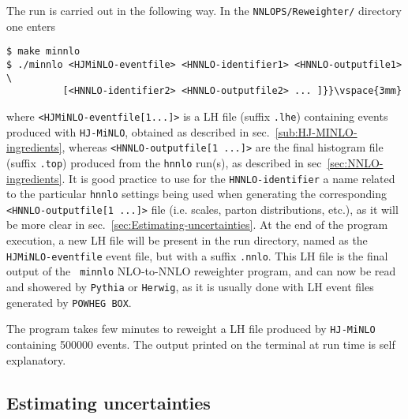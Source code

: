 \documentclass[11pt,a4paper]{article}
\newcommand{\noun}[1]{{\tt #1}}
\newcommand{\POWHEGBOX}{\noun{POWHEG BOX}}
\newcommand{\HJMINLO}{\noun{HJ-MiNLO}}
\newcommand{\HNNLO}{\noun{hnnlo}}
\newcommand{\PYTHIA}{\noun{Pythia}}
\newcommand{\HERWIG}{\noun{Herwig}}
\begin{document}
The run is carried out in the following way. In the {\tt{NNLOPS/Reweighter/}}
directory one enters
\begin{verbatim}
$ make minnlo
$ ./minnlo <HJMiNLO-eventfile> <HNNLO-identifier1> <HNNLO-outputfile1> \
          [<HNNLO-identifier2> <HNNLO-outputfile2> ... ]}}\vspace{3mm}
\end{verbatim}
where {\tt <HJMiNLO-eventfile[1...]>} is a LH file (suffix {\tt .lhe})
containing events produced with \HJMINLO{}, obtained as described in
sec.~\ref{sub:HJ-MINLO-ingredients}, whereas {\tt <HNNLO-outputfile[1 ...]>}
are the final histogram file (suffix {\tt .top}) produced from the \HNNLO{}
run(s), as described in sec~\ref{sec:NNLO-ingredients}.
It is good practice to use for the {\tt HNNLO-identifier}
a name related to the particular \HNNLO{} settings being used when
generating the corresponding {\tt <HNNLO-outputfile[1 ...]>} file (i.e. scales,
parton distributions, etc.), as
it will be more clear in sec.~\ref{sec:Estimating-uncertainties}.
At the end of the program execution, a new LH file will be present in
the run directory, named as the {\tt HJMiNLO-eventfile} event file,
but with a suffix {\tt .nnlo}. 
This LH file is the final output of the {\tt
  minnlo} NLO-to-NNLO reweighter program, and can now be read and
showered by \PYTHIA{} or \HERWIG{}, as it is usually done with LH
event files generated by \POWHEGBOX{}.


The program takes few minutes to reweight a LH file produced by
\HJMINLO{} containing 500000 events. The output printed on the
terminal at run time is self explanatory.



\subsection{Estimating uncertainties\label{sec:Estimating-uncertainties}}
\end{document}
